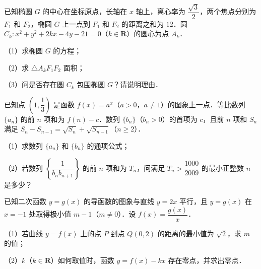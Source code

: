 \endgroup
\begin{question}
已知椭圆 $G$ 的中心在坐标原点，长轴在 $x$ 轴上，离心率为 $\dfrac{\sqrt3}{2}$，两个焦点分别为 $F_1$ 和 $F_2$，椭圆 $G$ 上一点到 $F_1$ 和 $F_2$ 的距离之和为 $12$．圆 $C_k:x^2+y^2+2kx-4y-21=0$（$k\in\mathbf R$）的圆心为点 $A_k$．

（1）求椭圆 $G$ 的方程；

（2）求 $\triangle A_kF_1F_2$ 面积；

（3）问是否存在圆 $C_k$ 包围椭圆 $G$？请说明理由．

\end{question}
\begin{question}
已知点 $\left(1,\dfrac13\right)$ 是函数 $f(x)=a^x$（$a>0$，$a\neq1$）的图象上一点．等比数列 $\{a_n\}$ 的前 $n$ 项和为 $f(n)-c$．数列 $\{b_n\}$（$b_n>0$）的首项为 $c$，且前 $n$ 项和 $S_n$ 满足 $S_n-S_{n-1}=\sqrt{S_n}+\sqrt{S_{n-1}}$（$n\geqslant2$）．

（1）求数列 $\{a_n\}$ 和 $\{b_n\}$ 的通项公式；

（2）若数列 $\left\{\dfrac{1}{b_nb_{n+1}}\right\}$ 的前 $n$ 项和为 $T_n$，问满足 $T_n>\dfrac{1000}{2009}$ 的最小正整数 $n$ 是多少？

\end{question}
\begin{question}
已知二次函数 $y=g(x)$ 的导函数的图象与直线 $y=2x$ 平行，且 $y=g(x)$ 在 $x=-1$ 处取得极小值 $m-1$（$m\neq0$）．设 $f(x)=\dfrac{g(x)}{x}$．

（1）若曲线 $y=f(x)$ 上的点 $P$ 到点 $Q(0,2)$ 的距离的最小值为 $\sqrt2$，求 $m$ 的值；

（2）$k$（$k\in\mathbf R$）如何取值时，函数 $y=f(x)-kx$ 存在零点，并求出零点．

\end{question}